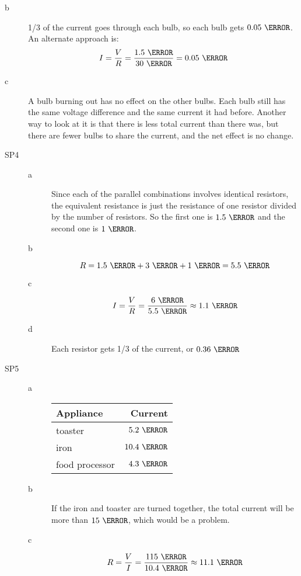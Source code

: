 \documentclass{exam}
\begin{document}
\begin{description}
\item[b]
1/3 of the current goes through each bulb, so each bulb gets $0.05 \ \ampere$.  An alternate approach is:
\[
  I = \frac{V}{R} = \frac{1.5 \ \volt}{30 \ \ohm} = 0.05 \ \ampere
\]

\item[c] 
A bulb burning out has no effect on the other bulbs.  Each bulb still has the same voltage difference and the
same current it had before.  Another way to look at it is that there is less total current than there was, but there
are fewer bulbs to share the current, and the net effect is no change.

\item[SP4]
\begin{description}
\item[a]
Since each of the parallel combinations involves identical resistors, the equivalent resistance is just the resistance
of one resistor divided by the number of resistors.  So the first one is $1.5 \ \ohm$ and the second one is $1 \ \ohm$.

\item[b]
\[
  R = 1.5 \ \ohm + 3 \ \ohm + 1 \ \ohm = 5.5 \ \ohm
\]

\item[c]
\[
  I = \frac{V}{R} = \frac{6 \ \volt}{5.5 \ \ohm} \approx 1.1 \ \ampere
\]

\item[d]
Each resistor gets 1/3 of the current, or $0.36 \ \ampere$

\end{description}

\item[SP5]

\begin{description}
\item[a]
\begin{tabular}{lr}
\toprule
Appliance & Current \\
\midrule
toaster        & $5.2 \ \ampere$\\
iron           & $10.4 \ \ampere$\\
food processor & $4.3 \ \ampere$\\
\bottomrule
\end{tabular}

\item[b]
If the iron and toaster are turned together, the total current will be more than $15 \
\ampere$, which would be a problem.

\item[c]
\[
  R = \frac{V}{I} = \frac{115 \ \volt}{10.4 \ \ampere} \approx 11.1 \ \ohm
\]

\end{description}


\end{description}
\else
\end{document}
